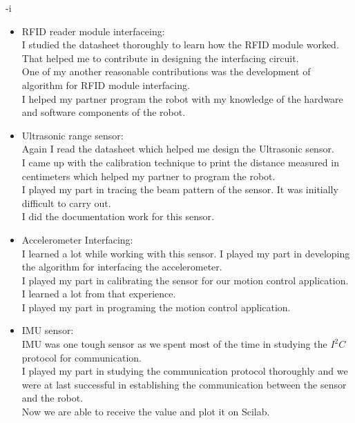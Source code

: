 -i\documentclass[a4paper,12 pt]{article}
\begin{document}
\begin{itemize}
\item RFID reader module interfaceing:\\

I studied the datasheet thoroughly to learn how the RFID module worked. That helped me to contribute in designing the interfacing circuit.\\
One of my another reasonable contributions was the development of algorithm for RFID module interfacing.\\
I helped my partner program the robot with my knowledge of the hardware and software components of the robot.
\item Ultrasonic range sensor:\\

Again I read the datasheet which helped me design the Ultrasonic sensor.\\
I came up with the calibration technique to print the distance measured in centimeters which helped my partner to program the robot.\\
I played my part in tracing the beam pattern of the sensor. It was initially difficult to carry out.\\
I did the documentation work for this sensor.\\

\item Accelerometer Interfacing:\\

I learned a lot while working with this sensor. I played my part in developing the algorithm for interfacing the accelerometer.\\
I played my part in calibrating the sensor for our motion control application. I learned a lot from that experience.\\
I played my part in programing the motion control application.\\

\item IMU sensor:\\
IMU was one tough sensor as we spent most of the time in studying the $I^2C$ protocol for communication.\\
I played my part in studying the communication protocol thoroughly and we were at last successful in establishing the communication between the sensor and the robot.\\
Now we are able to receive the value and plot it on Scilab.\\



\end{itemize}
\vspace{5mm}
\end{document}
